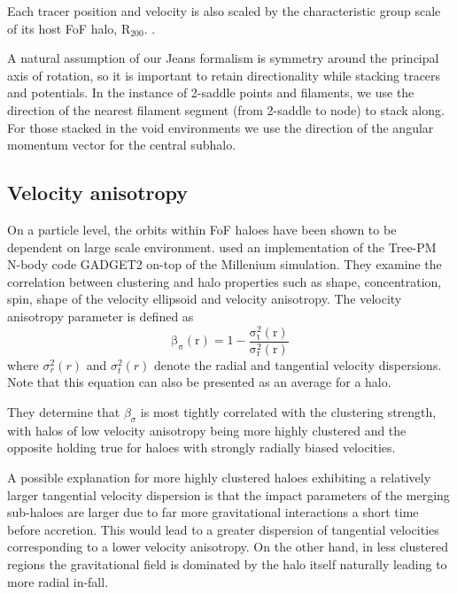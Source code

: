 Each tracer position and velocity is also scaled by the characteristic group scale of its host FoF halo, $\mathrm{R_{200}}$. . 

A natural assumption of our Jeans formalism is symmetry around the principal axis of rotation, so it is important to retain directionality while stacking tracers and potentials. In the instance of 2-saddle points and filaments, we use the direction of the nearest filament segment (from 2-saddle to node) to stack along. For those stacked in the void environments we use the direction of the angular momentum vector for the central subhalo. 

\subsection{Velocity anisotropy}
On a particle level, the orbits within FoF haloes have been shown to be dependent on large scale environment. \citet{faltenbacher2010} used an implementation of the Tree-PM N-body code GADGET2 on-top of the Millenium simulation. They examine the correlation between clustering and halo properties such as shape, concentration, spin, shape of the velocity ellipsoid and velocity anisotropy. The velocity anisotropy parameter is defined as
\begin{equation} \label{eq:vel_ani_sigma}
\mathrm{\beta_{\sigma}(r) = 1 - \frac{\sigma_t^2(r)}{\sigma_r^2(r)} }
\end{equation}
where $\sigma_r^2(r)$ and $\sigma_t^2(r)$ denote the radial and tangential velocity dispersions. Note that this equation can also be presented as an average for a halo. 

They determine that $\beta_{\sigma}$ is most tightly correlated with the clustering strength, with halos of low velocity anisotropy being more highly clustered and the opposite holding true for haloes with strongly radially biased velocities. 

A possible explanation for more highly clustered haloes exhibiting a relatively larger tangential velocity dispersion is that the impact parameters of the merging sub-haloes are larger due to far more gravitational interactions a short time before accretion. This would lead to a greater dispersion of tangential velocities corresponding to a lower velocity anisotropy. On the other hand, in less clustered regions the gravitational field is dominated by the halo itself naturally leading to more radial in-fall. 

